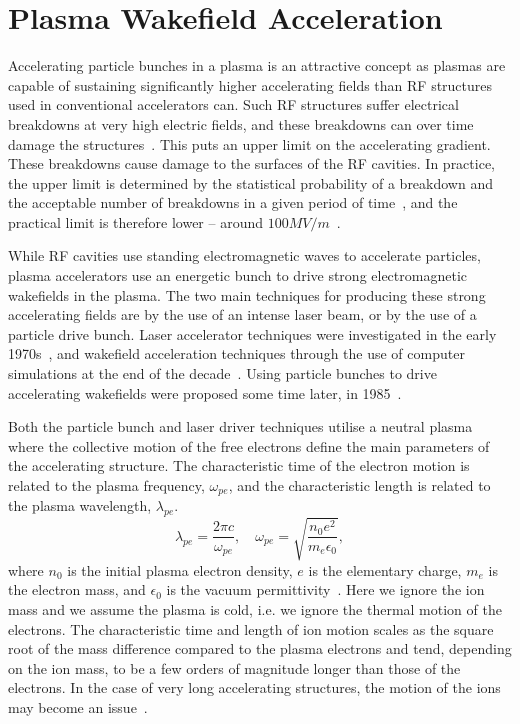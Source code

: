 \section{Plasma Wakefield Acceleration}
\label{Int:PWFA}

Accelerating particle bunches in a plasma is an attractive concept as plasmas are capable of sustaining significantly higher accelerating fields than RF structures used in conventional accelerators can.
Such RF structures suffer electrical breakdowns at very high electric fields, and these breakdowns can over time damage the structures~\cite{braun:2003}.
This puts an upper limit on the accelerating gradient.
These breakdowns cause damage to the surfaces of the RF cavities.
In practice, the upper limit is determined by the statistical probability of a breakdown and the acceptable number of breakdowns in a given period of time~\cite{pritzkau:2002}, and the practical limit is therefore lower -- around $100\unit{MV/m}$~\cite{aicheler:2012}.

While RF cavities use standing electromagnetic waves to accelerate particles, plasma accelerators use an energetic bunch to drive strong electromagnetic wakefields in the plasma.
The two main techniques for producing these strong accelerating fields are by the use of an intense laser beam, or by the use of a particle drive bunch.
Laser accelerator techniques were investigated in the early 1970s~\cite{chan:1971, palmer:1972}, and wakefield acceleration techniques through the use of computer simulations at the end of the decade~\cite{tajima:1979}.
Using particle bunches to drive accelerating wakefields were proposed some time later, in 1985~\cite{chen:1985}.

Both the particle bunch and laser driver techniques utilise a neutral plasma where the collective motion of the free electrons define the main parameters of the accelerating structure.
The characteristic time of the electron motion is related to the plasma frequency, $\omega_{pe}$, and the characteristic length is related to the plasma wavelength, $\lambda_{pe}$.
\begin{equation}
    \lambda_{pe} = \frac{2\pi c}{\omega_{pe}}, \quad
    \omega_{pe}  = \sqrt{\frac{n_{0}e^{2}}{m_{e}\epsilon_{0}}}, \label{EQ:PWFA:L0W0}
\end{equation}
where $n_{0}$ is the initial plasma electron density, $e$ is the elementary charge, $m_{e}$ is the electron mass, and $\epsilon_{0}$ is the vacuum permittivity~\cite{tonks:1929, esarey:1996, pecseli:2012}.
Here we ignore the ion mass and we assume the plasma is cold, i.e. we ignore the thermal motion of the electrons.
The characteristic time and length of ion motion scales as the square root of the mass difference compared to the plasma electrons and tend, depending on the ion mass, to be a few orders of magnitude longer than those of the electrons.
In the case of very long accelerating structures, the motion of the ions may become an issue~\cite{rosenzweig:2005}.

